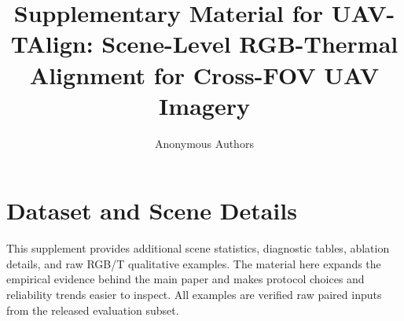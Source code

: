 \documentclass[runningheads]{LaTeX2e_Proceedings_Templates/llncs}
\begin{document}
\title{Supplementary Material for UAV-TAlign: Scene-Level RGB-Thermal Alignment for Cross-FOV UAV Imagery}

\author{Anonymous Authors}


\maketitle

\section{Dataset and Scene Details}

This supplement provides additional scene statistics, diagnostic tables, ablation details, and raw
RGB/T qualitative examples. The material here expands the empirical evidence behind the main paper
and makes protocol choices and reliability trends easier to inspect. All examples are verified raw
paired inputs from the released evaluation subset.
\end{document}
